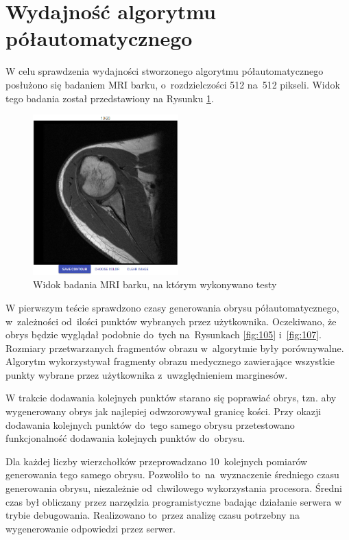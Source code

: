 \documentclass[a4paper,11pt,twoside,openright]{report}
\theoremstyle{definition}
\begin{document}
\section {Wydajność algorytmu półautomatycznego}

W celu sprawdzenia wydajności stworzonego algorytmu półautomatycznego posłużono
się badaniem MRI barku, o~rozdzielczości 512 na~512 pikseli. Widok tego badania został przedstawiony
na Rysunku \ref{fig:112}.

\begin{figure}[h!]
	\center
	\includegraphics[width=0.5\textwidth]{112}
	\caption{Widok badania MRI barku, na którym wykonywano testy}
    	\label{fig:112}
\end{figure}

\pagebreak

W pierwszym teście sprawdzono czasy generowania obrysu półautomatycznego,
 w~zależności od~ilości punktów wybranych przez użytkownika. Oczekiwano,
że obrys będzie wyglądał podobnie do~tych na~Rysunkach \ref{fig:105} i~\ref{fig:107}.
Rozmiary przetwarzanych fragmentów obrazu w~algorytmie były porównywalne. Algorytm
wykorzystywał fragmenty obrazu medycznego zawierające wszystkie punkty wybrane
przez użytkownika z~uwzględnieniem marginesów.

W trakcie dodawania kolejnych punktów starano się poprawiać obrys, tzn. aby
wygenerowany obrys jak najlepiej odwzorowywał granicę kości. Przy okazji dodawania kolejnych
punktów do~tego samego obrysu przetestowano funkcjonalność dodawania kolejnych
punktów do~obrysu.

Dla każdej liczby wierzchołków przeprowadzano 10~kolejnych pomiarów generowania
tego samego obrysu. Pozwoliło to~na~wyznaczenie średniego czasu generowania obrysu,
niezależnie od~chwilowego wykorzystania procesora. Średni czas był obliczany przez narzędzia
programistyczne badając działanie serwera w trybie debugowania. Realizowano to~przez
analizę czasu potrzebny na wygenerowanie odpowiedzi przez serwer.
\end{document}
